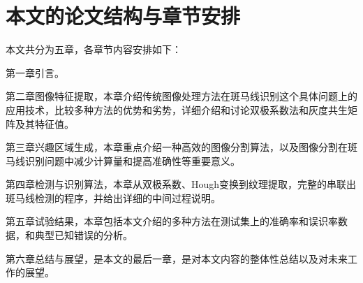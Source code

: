 \section{本文的论文结构与章节安排}

\label{sec:arrangement}
本文共分为五章，各章节内容安排如下：

第一章引言。

第二章图像特征提取，本章介绍传统图像处理方法在斑马线识别这个具体问题上的应用技术，比较多种方法的优势和劣势，详细介绍和讨论双极系数法和灰度共生矩阵及其特征值。

第三章兴趣区域生成，本章重点介绍一种高效的图像分割算法，以及图像分割在斑马线识别问题中减少计算量和提高准确性等重要意义。

第四章检测与识别算法，本章从双极系数、Hough变换到纹理提取，完整的串联出斑马线检测的程序，并给出详细的中间过程说明。

第五章试验结果，本章包括本文介绍的多种方法在测试集上的准确率和误识率数据，和典型已知错误的分析。

第六章总结与展望，是本文的最后一章，是对本文内容的整体性总结以及对未来工作的展望。

